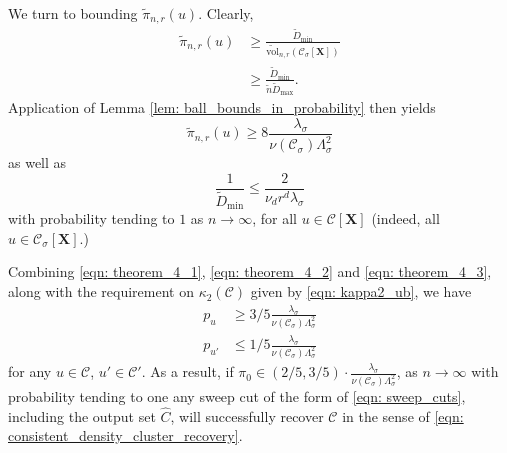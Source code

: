 \documentclass{article}
\newcommand{\vol}{\mathrm{vol}}
\newcommand{\1}{\mathbf{1}}
\newcommand{\Xbf}{\mathbf{X}}
\newcommand{\Cset}{\mathcal{C}}
\newcommand{\Csig}{\Cset_{\sigma}}
\newcommand{\wn}{\widetilde{n}}
\theoremstyle{aldenthm}
\begin{document}
We turn to bounding $\widetilde{\pi}_{n,r}(u)$. Clearly,
\begin{align*}
\widetilde{\pi}_{n,r}(u) & \geq \frac{\widetilde{D}_{\min}}{\widetilde{\vol}_{n,r}(\Csig[\Xbf])} \\
& \geq \frac{\widetilde{D}_{\min}}{\wn \widetilde{D}_{\max}}.
\end{align*}
Application of Lemma \ref{lem: ball_bounds_in_probability} then yields
\begin{equation}
\label{eqn: theorem_4_2}
\widetilde{\pi}_{n,r}(u) \geq 8 \frac{\lambda_{\sigma}}{\nu(\Csig) \Lambda_{\sigma}^2}
\end{equation}
as well as
\begin{equation}
\label{eqn: theorem_4_3}
\frac{1}{\widetilde{D}_{\min}} \leq \frac{2}{\nu_d r^d \lambda_{\sigma}}
\end{equation}
with probability tending to $1$ as $n \to \infty$, for all $u \in \Cset[\Xbf]$ (indeed, all $u \in \Csig[\Xbf]$.)

Combining \eqref{eqn: theorem_4_1}, \eqref{eqn: theorem_4_2} and \eqref{eqn: theorem_4_3}, along with the requirement on $\kappa_2(\Cset)$ given by \eqref{eqn: kappa2_ub}, we have
\begin{align*}
p_u & \geq 3/5 \frac{\lambda_{\sigma}}{\nu(\Csig) \Lambda_{\sigma}^2} \\
p_{u'} & \leq 1/5 \frac{\lambda_{\sigma}}{\nu(\Csig) \Lambda_{\sigma}^2}
\end{align*}
for any $u \in \Cset$, $u' \in \Cset'$. As a result, if $\pi_0 \in (2/5, 3/5)\cdot \frac{\lambda_{\sigma}}{\nu(\Csig) \Lambda_{\sigma}^2}$, as $n \to \infty$ with probability tending to one any sweep cut of the form of \eqref{eqn: sweep_cuts}, including the output set $\widehat{C}$, will successfully recover $\Cset$ in the sense of \eqref{eqn: consistent_density_cluster_recovery}.

\clearpage


\end{document}

